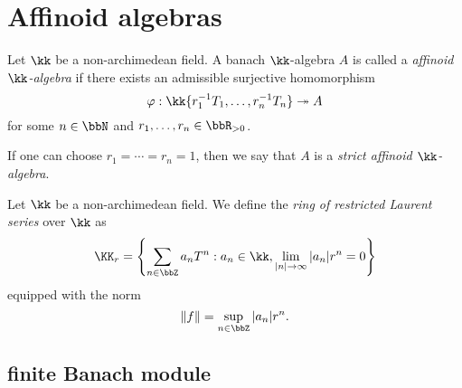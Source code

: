\section{Affinoid algebras}

    \begin{definition}\label{def:affinoid_algebras}
        Let \(\kk\) be a non-archimedean field. 
        A banach \(\kk\)-algebra \(A\) is called a \emph{ affinoid \(\kk\)-algebra} if there exists an admissible surjective homomorphism
        \[
            \varphi: \kk\{ r_1^{-1} T_1, \ldots, r_n^{-1} T_n \} \twoheadrightarrow A
        \]
        for some \(n \in \bbN\) and \(r_1, \ldots, r_n \in \bbR_{>0}\).

        If one can choose \(r_1 = \cdots = r_n = 1\), then we say that \(A\) is a \emph{strict affinoid \(\kk\)-algebra}.
    \end{definition}

    \begin{definition}\label{def:restricted_Laurent_series}
        Let \(\kk\) be a non-archimedean field.
        We define the \emph{ring of restricted Laurent series} over \(\kk\) as 
        \[ \KK_r = \left\{\sum_{n \in \bbZ} a_n T^n : a_n \in \kk, \lim_{|n| \to \infty} |a_n| r^n = 0 \right\} \]
        equipped with the norm
        \[ \|f\| = \sup_{n \in \bbZ} |a_n| r^n. \]
    \end{definition}


\subsection{finite Banach module}